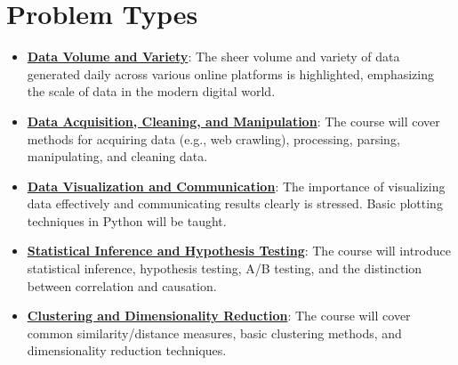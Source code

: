 \documentclass{article}%
\begin{document}
\section{Problem Types}%
\label{sec:ProblemTypes}%
\begin{itemize}[leftmargin=*]%
\item \href{https://purdue.brightspace.com/d2l/common/assets/pdfjs-d2l-dist/1.0.14-legacy/web/viewer.html?file=\%2Fcontent\%2Fenforced\%2F1095465-WL.202510.CS24200.LE1\%2F01L1-introduction.pdf\%3Fou\%3D1095465\&lang=en-us\&container=d2l-fileviewer-rendered-pdf\&fullscreen=d2l-fileviewer-rendered-pdf-dialog\&height=667#page=2}{\textbf{Data Volume and Variety}}: The sheer volume and variety of data generated daily across various online platforms is highlighted, emphasizing the scale of data in the modern digital world.%
\item \href{https://purdue.brightspace.com/d2l/common/assets/pdfjs-d2l-dist/1.0.14-legacy/web/viewer.html?file=\%2Fcontent\%2Fenforced\%2F1095465-WL.202510.CS24200.LE1\%2F01L1-introduction.pdf\%3Fou\%3D1095465\&lang=en-us\&container=d2l-fileviewer-rendered-pdf\&fullscreen=d2l-fileviewer-rendered-pdf-dialog\&height=667#page=4}{\textbf{Data Acquisition, Cleaning, and Manipulation}}: The course will cover methods for acquiring data (e.g., web crawling), processing, parsing, manipulating, and cleaning data.%
\item \href{https://purdue.brightspace.com/d2l/common/assets/pdfjs-d2l-dist/1.0.14-legacy/web/viewer.html?file=\%2Fcontent\%2Fenforced\%2F1095465-WL.202510.CS24200.LE1\%2F01L1-introduction.pdf\%3Fou\%3D1095465\&lang=en-us\&container=d2l-fileviewer-rendered-pdf\&fullscreen=d2l-fileviewer-rendered-pdf-dialog\&height=667#page=4}{\textbf{Data Visualization and Communication}}: The importance of visualizing data effectively and communicating results clearly is stressed. Basic plotting techniques in Python will be taught.%
\item \href{https://purdue.brightspace.com/d2l/common/assets/pdfjs-d2l-dist/1.0.14-legacy/web/viewer.html?file=\%2Fcontent\%2Fenforced\%2F1095465-WL.202510.CS24200.LE1\%2F01L1-introduction.pdf\%3Fou\%3D1095465\&lang=en-us\&container=d2l-fileviewer-rendered-pdf\&fullscreen=d2l-fileviewer-rendered-pdf-dialog\&height=667#page=4}{\textbf{Statistical Inference and Hypothesis Testing}}: The course will introduce statistical inference, hypothesis testing, A/B testing, and the distinction between correlation and causation.%
\item \href{https://purdue.brightspace.com/d2l/common/assets/pdfjs-d2l-dist/1.0.14-legacy/web/viewer.html?file=\%2Fcontent\%2Fenforced\%2F1095465-WL.202510.CS24200.LE1\%2F01L1-introduction.pdf\%3Fou\%3D1095465\&lang=en-us\&container=d2l-fileviewer-rendered-pdf\&fullscreen=d2l-fileviewer-rendered-pdf-dialog\&height=667#page=4}{\textbf{Clustering and Dimensionality Reduction}}: The course will cover common similarity/distance measures, basic clustering methods, and dimensionality reduction techniques.%

\end{itemize}
\end{document}
